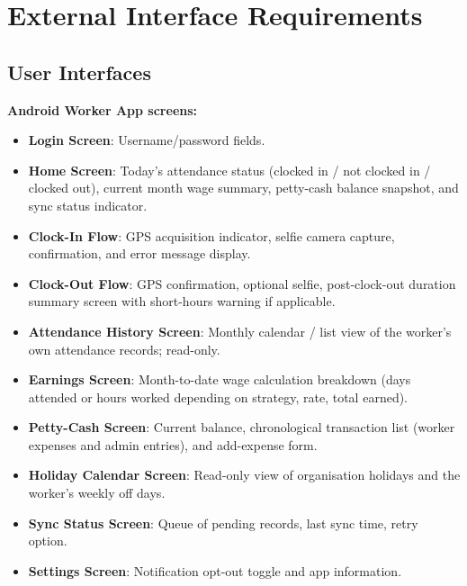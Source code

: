 \documentclass[12pt, a4paper]{article}
\begin{document}
\section{External Interface Requirements}

\subsection{User Interfaces}

\textbf{Android Worker App screens:}
\begin{itemize}
    \item \textbf{Login Screen}: Username/password fields.
    \item \textbf{Home Screen}: Today's attendance status (clocked in /
          not clocked in / clocked out), current month wage summary,
          petty-cash balance snapshot, and sync status indicator.
    \item \textbf{Clock-In Flow}: GPS acquisition indicator, selfie
          camera capture, confirmation, and error message display.
    \item \textbf{Clock-Out Flow}: GPS confirmation, optional selfie,
          post-clock-out duration summary screen with short-hours warning
          if applicable.
    \item \textbf{Attendance History Screen}: Monthly calendar / list
          view of the worker's own attendance records; read-only.
    \item \textbf{Earnings Screen}: Month-to-date wage calculation
          breakdown (days attended or hours worked depending on strategy,
          rate, total earned).
    \item \textbf{Petty-Cash Screen}: Current balance, chronological
          transaction list (worker expenses and admin entries), and
          add-expense form.
    \item \textbf{Holiday Calendar Screen}: Read-only view of
          organisation holidays and the worker's weekly off days.
    \item \textbf{Sync Status Screen}: Queue of pending records, last
          sync time, retry option.
    \item \textbf{Settings Screen}: Notification opt-out toggle and app
          information.
\end{itemize}
\end{document}
